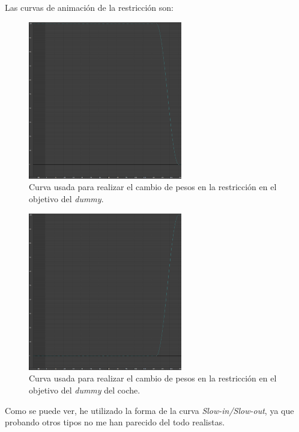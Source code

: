 Las curvas de animación de la restricción son:

\begin{figure}[H]
    \centering
   \includegraphics[width=0.6\textwidth]{imagenes/espada/lookat0.png}
   \caption{Curva usada para realizar el cambio de pesos en la restricción en el objetivo del \textit{dummy}.}
\end{figure}

\begin{figure}[H]
    \centering
   \includegraphics[width=0.6\textwidth]{imagenes/espada/lookat1.png}
   \caption{Curva usada para realizar el cambio de pesos en la restricción en el objetivo del \textit{dummy} del coche.}
\end{figure}

Como se puede ver, he utilizado la forma de la curva \textit{Slow-in/Slow-out}, ya que probando otros tipos no me han parecido del todo realistas.

\bigskip

